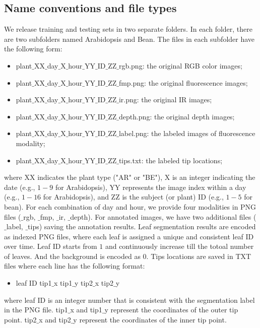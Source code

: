\subsection{Name conventions and file types}
We release training and testing sets in two separate folders.
In each folder, there are two subfolders named Arabidopsis and Bean.
The files in each subfolder have the following form:
\begin{itemize}
  \item plant$\_$XX$\_$day$\_$X$\_$hour$\_$YY$\_$ID$\_$ZZ$\_$rgb.png: the original RGB color images;
  \item plant$\_$XX$\_$day$\_$X$\_$hour$\_$YY$\_$ID$\_$ZZ$\_$fmp.png: the original fluorescence images;
  \item plant$\_$XX$\_$day$\_$X$\_$hour$\_$YY$\_$ID$\_$ZZ$\_$ir.png: the original IR images;
  \item plant$\_$XX$\_$day$\_$X$\_$hour$\_$YY$\_$ID$\_$ZZ$\_$depth.png: the original depth images;
  \item plant$\_$XX$\_$day$\_$X$\_$hour$\_$YY$\_$ID$\_$ZZ$\_$label.png: the labeled images of fluorescence modality;
  \item plant$\_$XX$\_$day$\_$X$\_$hour$\_$YY$\_$ID$\_$ZZ$\_$tips.txt: the labeled tip locations;
\end{itemize}
where XX indicates the plant type ("AR" or "BE"), X is an integer indicating the date (e.g., $1-9$ for Arabidopsis), YY represents the image index within a day (e.g., $1-16$ for Arabidopsis), and ZZ is the subject (or plant) ID (e.g., $1-5$ for bean).
For each combination of day and hour, we provide four modalities in PNG files ($\_$rgb, $\_$fmp, $\_$ir, $\_$depth).
For annotated images, we have two additional files ($\_$label, $\_$tips) saving the annotation results.
Leaf segmentation results are encoded as indexed PNG files, where each leaf is assigned a unique and consistent leaf ID over time.
Leaf ID starts from $1$ and continuously increase till the totoal number of leaves.
And the background is encoded as $0$.
Tips locations are saved in TXT files where each line has the following format:
\begin{itemize}
  \item leaf ID \quad tip1$\_$x \quad tip1$\_$y \quad tip2$\_$x \quad  tip2$\_$y
\end{itemize}
where leaf ID is an integer number that is consistent with the segmentation label in the PNG file.
tip1$\_$x and tip1$\_$y represent the coordinates of the outer tip point.
tip2$\_$x and tip2$\_$y represent the coordinates of the inner tip point.


